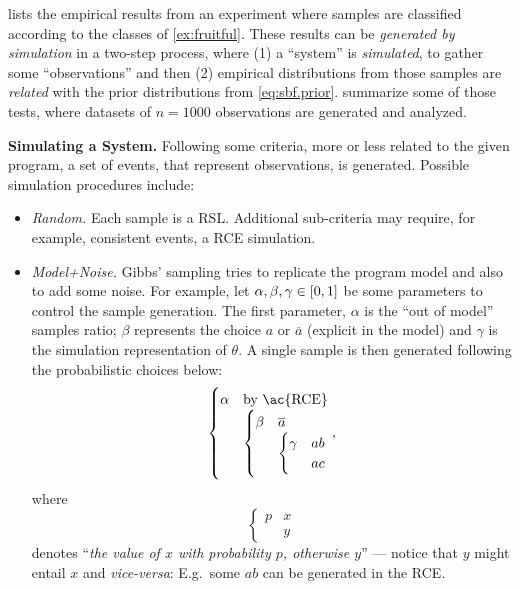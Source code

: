 \documentclass{tlp}
\renewcommand{\cite}{\citep}
\newcommand{\co}[1]{\ensuremath{\overline{#1}}}     %
\begin{document}
 lists the empirical results from an experiment 
where samples are classified according to 
the classes of \cref{ex:fruitful}.
These results can be \emph{generated by simulation} in a two-step
process, where (1) a ``system'' is \emph{simulated}, to gather some
``observations'' and then (2) empirical distributions from those
samples are \emph{related} with the prior distributions from
\cref{eq:sbf.prior}.  
summarize some of those tests, where datasets of \(n = 1000\)
observations are generated and analyzed.

\bigskip\noindent\textbf{Simulating a System.} Following some
criteria, more or less related to the given program, a set of events,
that represent observations, is generated.  Possible simulation
procedures include:
\begin{itemize}

\item \emph{Random.} Each sample is a \ac{RSL}.  Additional
  sub-criteria may require, for example, consistent events, a \ac{RCE}
  simulation.

\item \emph{Model+Noise.} Gibbs' sampling \cite{geman84} tries to
  replicate the program model and also to add some noise.  For
  example, let \(\alpha, \beta, \gamma \in \intcc{0,1}\) be some
  parameters to control the sample generation.  The first parameter,
  \(\alpha\) is the ``out of model'' samples ratio; \(\beta\)
  represents the choice \(a\) or \(\co{a}\) (explicit in the model)
  and \(\gamma\) is the simulation representation of \(\theta\).  A
  single sample is then generated following the probabilistic choices
  below:
          \[
              \begin{cases}
                  \alpha & \text{by \ac{RCE}} \\[0pt]
                         &
                  \begin{cases}
                      \beta & \co{a} \\[0pt]
                            &
                      \begin{cases}
                          \gamma & ab \\[0pt]
                                 & ac
                      \end{cases}
                  \end{cases}
              \end{cases},
          \]
          where \[
              \begin{cases}
                  p & x \\[-4pt]
                    & y\end{cases}
          \]
          denotes ``\emph{the value of \(x\) with probability \(p\),
            otherwise \(y\)}'' --- notice that \(y\) might entail
          \(x\) and \emph{vice-versa}: E.g.\ some \(ab\) can be
          generated in the \ac{RCE}.


\end{itemize}
\end{document}
